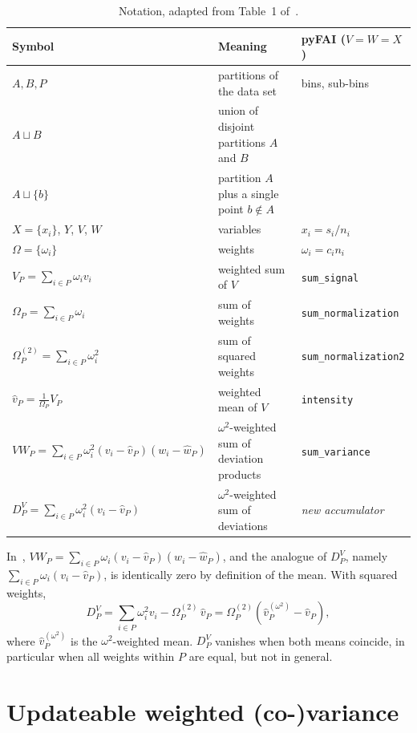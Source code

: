 \documentclass[a4paper,11pt]{article}
\newcommand{\mean}[1]{\widehat{#1}}
\newcommand{\Om}{\Omega}
\newcommand{\OmS}{\Omega^{(2)}}
\newcommand{\D}[2]{D^{#1}_{#2}}
\newcommand{\AB}{{A\sqcup B}}
\newcommand{\Ab}{{A\sqcup\{b\}}}
\begin{document}
\begin{table}[ht]
\centering
\small\setlength{\tabcolsep}{4pt}\begin{tabular}{lll}
\toprule
Symbol & Meaning & pyFAI ($V=W=X$) \\
\midrule
$A, B, P$ & partitions of the data set & bins, sub-bins \\
$\AB$ & union of disjoint partitions $A$ and $B$ & \\
$\Ab$ & partition $A$ plus a single point $b\notin A$ & \\
$X=\{x_i\}$, $Y$, $V$, $W$ & variables & $x_i = s_i/n_i$ \\
$\Om=\{\omega_i\}$ & weights & $\omega_i = c_i n_i$ \\
$V_P=\sum_{i\in P}\omega_i v_i$ & weighted sum of $V$ & \texttt{sum\_signal} \\
$\Om_P=\sum_{i\in P}\omega_i$ & sum of weights & \texttt{sum\_normalization} \\
$\OmS_P=\sum_{i\in P}\omega_i^2$ & sum of squared weights & \texttt{sum\_normalization2} \\
$\mean{v}_P=\frac{1}{\Om_P}V_P$ & weighted mean of $V$ & \texttt{intensity} \\
$VW_P=\sum_{i\in P}\omega_i^2(v_i-\mean{v}_P)(w_i-\mean{w}_P)$ & $\omega^2$-weighted sum of deviation products & \texttt{sum\_variance} \\
$\D{V}{P}=\sum_{i\in P}\omega_i^2(v_i-\mean{v}_P)$ & $\omega^2$-weighted sum of deviations & \emph{new accumulator} \\
\bottomrule
\end{tabular}
\caption{Notation, adapted from Table~1 of~\cite{SG18}.}
\label{tab:notation}
\end{table}

In~\cite{SG18}, $VW_P=\sum_{i\in P}\omega_i(v_i-\mean{v}_P)(w_i-\mean{w}_P)$, and the analogue of
$\D{V}{P}$, namely $\sum_{i\in P}\omega_i(v_i-\mean{v}_P)$, is identically zero by definition of the
mean. With squared weights,
\begin{equation}
  \D{V}{P} = \sum_{i\in P}\omega_i^2 v_i - \OmS_P\,\mean{v}_P = \OmS_P\left(\mean{v}^{(\omega^2)}_P - \mean{v}_P\right),
  \label{eq:D}
\end{equation}
where $\mean{v}^{(\omega^2)}_P$ is the $\omega^2$-weighted mean. $\D{V}{P}$ vanishes when both means
coincide, in particular when all weights within $P$ are equal, but not in general.

\section{Updateable weighted (co-)variance}
\end{document}
